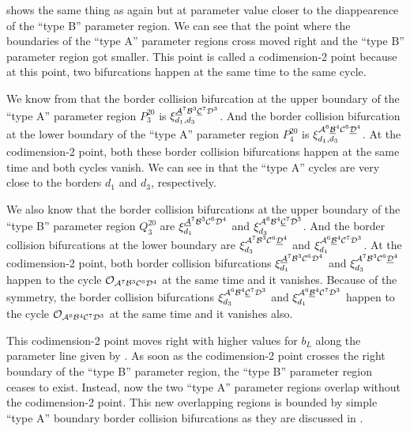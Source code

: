  shows the same thing as  again but at parameter value closer to the diappearence of the ``type B'' parameter region.
We can see that the point where the boundaries of the ``type A'' parameter regions cross moved right and the ``type B'' parameter region got smaller.
This point is called a codimension-2 point because at this point, two bifurcations happen at the same time to the same cycle.

We know from  that the border collision bifurcation at the upper boundary of the ``type A'' parameter region $P^{20}_3$ is $\xi_{d_1, d_3}^{\underline{\mathcal{A}}^7\mathcal{B}^3\underline{\mathcal{C}}^7\mathcal{D}^3}$.
And the border collision bifurcation at the lower boundary of the ``type A'' parameter region $P^{20}_4$ is $\xi_{d_1, d_3}^{\mathcal{A}^6\underline{\mathcal{B}}^4\mathcal{C}^6\underline{\mathcal{D}}^4}$.
At the codimension-2 point, both these border collision bifurcations happen at the same time and both cycles vanish.
We can see in  that the ``type A'' cycles are very close to the borders $d_1$ and $d_3$, respectively.

We also know that the border collision bifurcations at the upper boundary of the ``type B'' parameter region $Q^{20}_3$ are $\xi_{d_1}^{\underline{\mathcal{A}}^7\mathcal{B}^3\mathcal{C}^6\mathcal{D}^4}$ and $\xi_{d_3}^{\mathcal{A}^6\mathcal{B}^4\underline{\mathcal{C}}^7\mathcal{D}^3}$.
And the border collision bifurcations at the lower boundary are $\xi_{d_3}^{\mathcal{A}^7\mathcal{B}^3\mathcal{C}^6\underline{\mathcal{D}}^4}$ and $\xi_{d_1}^{\mathcal{A}^6\underline{\mathcal{B}}^4\mathcal{C}^7\mathcal{D}^3}$.
At the codimension-2 point, both border collision bifurcations $\xi_{d_1}^{\underline{\mathcal{A}}^7\mathcal{B}^3\mathcal{C}^6\mathcal{D}^4}$ and $\xi_{d_3}^{\mathcal{A}^7\mathcal{B}^3\mathcal{C}^6\underline{\mathcal{D}}^4}$ happen to the cycle $\mathcal{O}_{\mathcal{A}^7\mathcal{B}^3\mathcal{C}^6\mathcal{D}^4}$ at the same time and it vanishes.
Because of the symmetry, the border collision bifurcations $\xi_{d_3}^{\mathcal{A}^6\mathcal{B}^4\underline{\mathcal{C}}^7\mathcal{D}^3}$ and $\xi_{d_1}^{\mathcal{A}^6\underline{\mathcal{B}}^4\mathcal{C}^7\mathcal{D}^3}$ happen to the cycle $\mathcal{O}_{\mathcal{A}^6\mathcal{B}^4\mathcal{C}^7\mathcal{D}^3}$ at the same time and it vanishes also.

This codimension-2 point moves right with higher values for $b_L$ along the parameter line given by .
As soon as the codimension-2 point crosses the right boundary of the ``type B'' parameter region, the ``type B'' parameter region ceases to exist.
Instead, now the two ``type A'' parameter regions overlap without the codimension-2 point.
This new overlapping regions is bounded by simple ``type A'' boundary border collision bifurcations as they are discussed in .

